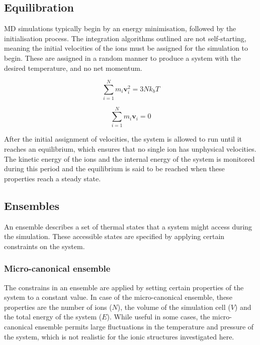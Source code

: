 \documentclass[12pt]{report}
\begin{document}
\subsection{Equilibration}

MD simulations typically begin by an energy minimisation, followed by the initialisation process.
The integration algorithms outlined are not self-starting, meaning the initial velocities of the ions must be assigned for the simulation to begin.
These are assigned in a random manner to produce a system with the desired temperature, and no net momentum.

\begin{equation}
    \sum_{i=1}^N m_i \textbf{v}_i^2 = 3Nk_bT
    \label{boltzmann}
\end{equation}

\begin{equation}
    \sum_{i=1}^N m_i \textbf{v}_i = 0
\end{equation}

\noindent
After the initial assignment of velocities, the system is allowed to run until it reaches an equilibrium, which ensures that no single ion has unphysical velocities.
The kinetic energy of the ions and the internal energy of the system is monitored during this period and the equilibrium is said to be reached when these properties reach a steady state.

\subsection{Ensembles}

An ensemble describes a set of thermal states that a system might access during the simulation.
These accessible states are specified by applying certain constraints on the system.

\subsubsection{Micro-canonical ensemble}

The constrains in an ensemble are applied by setting certain properties of the system to a constant value.
In case of the micro-canonical ensemble, these properties are the number of ions ($N$), the volume of the simulation cell ($V$) and the total energy of the system ($E$).
While useful in some cases, the micro-canonical ensemble permits large fluctuations in the temperature and pressure of the system, which is not realistic for the ionic structures investigated here.
\end{document}
